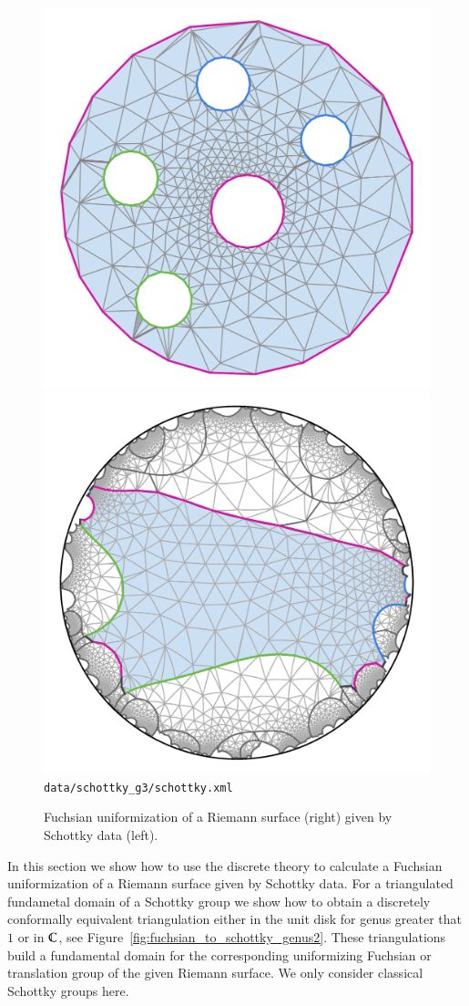 \documentclass[Thesis.tex]{subfiles}
\begin{document}
\begin{figure} 
\centering
\includegraphics[width=0.45\linewidth]{data/schottky_g3/genus3_image2}
\includegraphics[width=0.45\linewidth]{data/schottky_g3/genus3_domain2}
{\scriptsize\tt data/schottky\_g3/schottky.xml} 
\caption{Fuchsian uniformization of a Riemann surface (right) given by
Schottky data (left).} 
\label{fig:fuchsian_to_schottky_genus3} 
\end{figure}

In this section we show how to use the discrete theory to calculate a Fuchsian
uniformization of a Riemann surface given by Schottky data. For a triangulated
fundametal domain of a Schottky group we show how to obtain a discretely
conformally equivalent triangulation either in the unit disk for genus greater
that $1$ or in $\mathbb C$, see Figure~\ref{fig:fuchsian_to_schottky_genus2}. These
triangulations build a fundamental domain for the corresponding uniformizing
Fuchsian or translation group of the given Riemann surface. We only consider
classical Schottky groups here.
\end{document}
